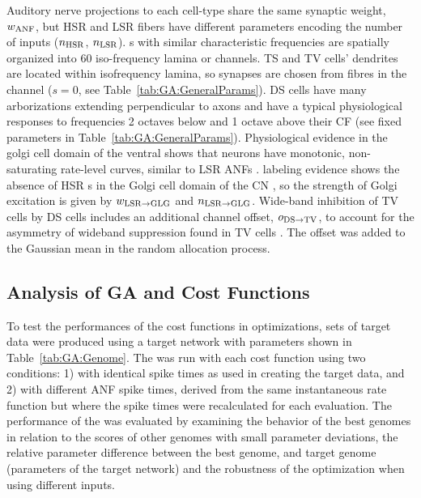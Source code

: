 \smallskip{}

Auditory nerve projections to each {\CN} cell-type share the same
synaptic weight, $w_{{\rm ANF}} $, but HSR and LSR fibers have
different parameters encoding the number of inputs ($n_{{\rm HSR}} $,
$n_{{\rm LSR}} $). {\ANF}s with similar characteristic frequencies are
spatially organized into 60 iso-frequency lamina or channels. TS and
TV cells' dendrites are located within isofrequency lamina, so
synapses are chosen from fibres in the channel ($s=0$, see
Table~\ref{tab:GA:GeneralParams}). DS cells have many arborizations
extending perpendicular to {\ANF} axons and have a typical physiological
responses to frequencies 2 octaves below and 1 octave above their CF
\citep{PalmerJiangEtAl:1996,PaoliniClark:1999} (see fixed parameters
in Table~\ref{tab:GA:GeneralParams}).  Physiological evidence in the
golgi cell domain of the ventral {\CN} shows that neurons have monotonic,
non-saturating rate-level curves, similar to LSR ANFs
\citep{GhoshalKim:1996a}. {\ANF} labeling evidence shows the absence of
HSR {\ANF}s in the Golgi cell domain of the CN
\citep{Liberman:1991,Ryugo:2008,RhodeOertelEtAl:1983}, so the strength
of Golgi excitation is given by $w_{{\rm LSR}\to {\rm GLG}} $ and
$n_{{\rm LSR}\to {\rm GLG}} $. Wide-band inhibition of TV cells by DS
cells includes an additional channel offset, $o_{{\rm DS}\to {\rm TV}}
$, to account for the asymmetry of wideband suppression found in TV
cells \citep{ReissYoung:2005}.  The offset was added to the Gaussian
mean in the random allocation process.

\subsection{Analysis of {GA} and Cost Functions}\label{sec:GA:analysis-ga-cost}

To test the performances of the cost functions in {\GA} optimizations,
sets of target data were produced using a target {\CN} network with
parameters shown in Table~\ref{tab:GA:Genome}.  The {\GA} was run with
each cost function using two conditions: 1) with identical {\ANF} spike
times as used in creating the target data, and 2) with different ANF
spike times, derived from the same instantaneous rate function but
where the spike times were recalculated for each evaluation.  The
performance of the {\GA} was evaluated by examining the behavior of the
best genomes in relation to the scores of other genomes with small
parameter deviations, the relative parameter difference between the
best genome, and target genome (parameters of the target network) and
the robustness of the optimization when using different {\ANF} inputs.

